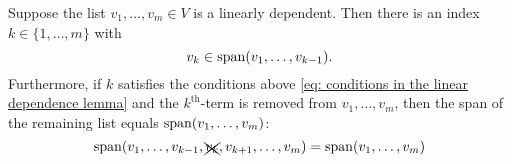 


\setcounter{thm}{18}
\begin{thm} 
  \label{thm: linear dependence lemma}
  Suppose the list $v_{1}, \dots, v_{m}\in V$ is a linearly dependent. Then there is an index $k \in \{ 1, \dots, m \}$ with
  \begin{equation}
    \label{eq: conditions in the linear dependence lemma}
    v_k \in \operatorname{span} (v_1, \dots, v_{k-1}).
  \end{equation}
  Furthermore, if $k$ satisfies the conditions above \eqref{eq: conditions in the linear dependence lemma} and the $k^{\text{th}}$-term is removed from $v_1, \dots, v_m$, then the span of the remaining list equals $\operatorname{span} (v_1, \dots, v_{m})$:
  \begin{equation}
    \operatorname{span} (v_1, \dots, v_{k-1},  \xcancel{v_k}, v_{k+1}, \dots, v_m) = \operatorname{span} (v_1, \dots, v_m)
  \end{equation}
\end{thm}

